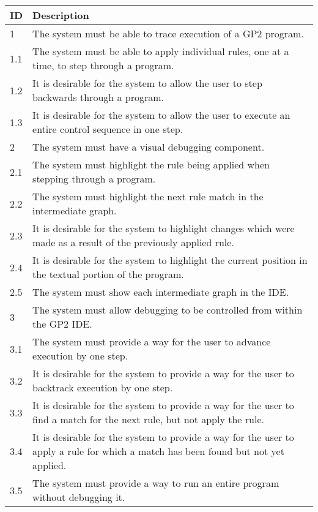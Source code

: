 \documentclass[authoryearcitations]{UoYCSproject}
\begin{document}
\begin{table}[tbp]
    \begin{tabularx}{\linewidth}{|l|X|}
        \hline
        \textbf{ID} & \textbf{Description} \\
        \hline
        1    &  The system must be able to trace execution of a GP2 program. \\ \hline
        1.1  &  The system must be able to apply individual rules, one at a time,
                to step through a program. \\ \hline
        1.2  &  It is desirable for the system to allow the user to step
                backwards through a program. \\ \hline
        1.3  &  It is desirable for the system to allow the user to execute an
                entire control sequence in one step. \\ \hline

        2    &  The system must have a visual debugging component. \\ \hline
        2.1  &  The system must highlight the rule being applied when stepping
                through a program. \\ \hline
        2.2  &  The system must highlight the next rule match in the intermediate
                graph. \\ \hline
        2.3  &  It is desirable for the system to highlight changes which were
                made as a result of the previously applied rule. \\ \hline
        2.4  &  It is desirable for the system to highlight the current position
                in the textual portion of the program. \\ \hline
        2.5  &  The system must show each intermediate graph in the IDE. \\ \hline

        3    &  The system must allow debugging to be controlled from within the
                GP2 IDE. \\ \hline
        3.1  &  The system must provide a way for the user to advance execution
                by one step. \\ \hline
        3.2  &  It is desirable for the system to provide a way for the user to
                backtrack execution by one step. \\ \hline
        3.3  &  It is desirable for the system to provide a way for the user to
                find a match for the next rule, but not apply the rule. \\ \hline
        3.4  &  It is desirable for the system to provide a way for the user to
                apply a rule for which a match has been found but not yet applied.
                \\ \hline
        3.5  &  The system must provide a way to run an entire program without
                debugging it. \\ \hline


\end{tabularx}
\end{table}
\end{document}
